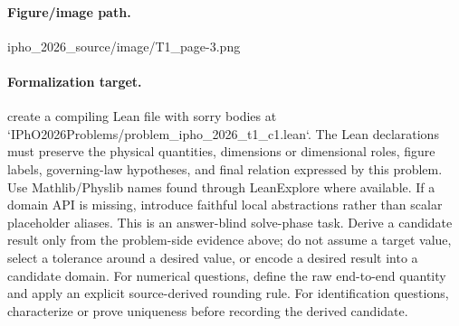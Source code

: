 \paragraph{Figure/image path.}
ipho\_2026\_source/image/T1\_page-3.png

\paragraph{Formalization target.}
create a compiling Lean file with sorry bodies at `IPhO2026Problems/problem\_ipho\_2026\_t1\_c1.lean`.
The Lean declarations must preserve the physical quantities, dimensions or dimensional roles, figure labels, governing-law hypotheses, and final relation expressed by this problem.
Use Mathlib/Physlib names found through LeanExplore where available. If a domain API is missing, introduce faithful local abstractions rather than scalar placeholder aliases.
This is an answer-blind solve-phase task. Derive a candidate result only from the problem-side evidence above; do not assume a target value, select a tolerance around a desired value, or encode a desired result into a candidate domain.
For numerical questions, define the raw end-to-end quantity and apply an explicit source-derived rounding rule. For identification questions, characterize or prove uniqueness before recording the derived candidate.

